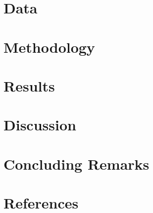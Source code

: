 \documentclass[
    ngerman,american
    ]{scrartcl}
\begin{document}
        \section{Data}

        \section{Methodology}

        \section{Results}

        \section{Discussion}

        \section{Concluding Remarks}
                
        
        \section{References}

        
            
            
\end{document}
